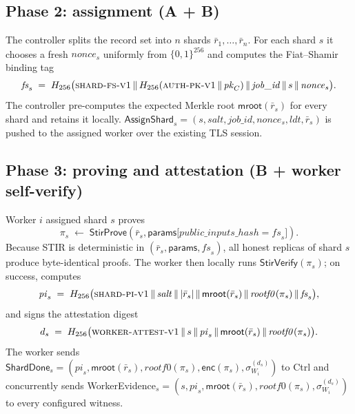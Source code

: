 \documentclass[11pt,a4paper]{article}
\theoremstyle{definition}
\theoremstyle{plain}
\newcommand{\msg}[1]{\textsf{#1}}
\newcommand{\ctrl}{\msg{Ctrl}}
\newcommand{\hash}{\ensuremath{H}}
\newcommand{\sig}[2]{\ensuremath{\sigma_{#1}^{(#2)}}}
\newcommand{\concat}{\,\Vert\,}
\begin{document}
\subsection{Phase 2: assignment (A + B)}

The controller splits the record set into $n$ shards
$\bar{r}_1, \dots, \bar{r}_n$.  For each shard $s$ it chooses a fresh
$\mathit{nonce}_s$ uniformly from $\{0,1\}^{256}$ and computes the
Fiat--Shamir binding tag
\begin{equation}
  \mathit{fs}_s \;=\; \hash_{256}\bigl(\textsc{shard-fs-v1}
        \concat \hash_{256}(\textsc{auth-pk-v1} \concat \mathit{pk}_C)
        \concat \mathit{job\_id}
        \concat s
        \concat \mathit{nonce}_s\bigr).
  \label{eq:fs-binding}
\end{equation}
The controller pre-computes the expected Merkle root
$\mathsf{mroot}(\bar{r}_s)$ for every shard and retains it locally.
$\msg{AssignShard}_s = (s, \mathit{salt}, \mathit{job\_id},
\mathit{nonce}_s, \mathit{ldt}, \bar{r}_s)$ is pushed to the assigned
worker over the existing TLS session.

\subsection{Phase 3: proving and attestation (B + worker self-verify)}

Worker $i$ assigned shard $s$ proves
\[
  \pi_s \;\leftarrow\; \msg{StirProve}(\bar{r}_s,
      \textsf{params}\bigl[\mathit{public\_inputs\_hash} = \mathit{fs}_s\bigr]).
\]
Because STIR is deterministic in
$(\bar{r}_s, \textsf{params}, \mathit{fs}_s)$, all honest replicas of
shard $s$ produce byte-identical proofs.  The worker then locally runs
$\msg{StirVerify}(\pi_s)$; on success, computes
\begin{equation}
  \mathit{pi}_s \;=\; \hash_{256}\bigl(\textsc{shard-pi-v1}
       \concat \mathit{salt} \concat |\bar{r}_s|
       \concat \mathsf{mroot}(\bar{r}_s)
       \concat \mathit{rootf0}(\pi_s)
       \concat \mathit{fs}_s\bigr),
  \label{eq:pi-hash}
\end{equation}
and signs the attestation digest
\begin{equation}
  d_s \;=\; \hash_{256}\bigl(\textsc{worker-attest-v1}
       \concat s
       \concat \mathit{pi}_s
       \concat \mathsf{mroot}(\bar{r}_s)
       \concat \mathit{rootf0}(\pi_s)\bigr).
  \label{eq:attest-digest}
\end{equation}
The worker sends $\msg{ShardDone}_s = (\mathit{pi}_s,
\mathsf{mroot}(\bar{r}_s), \mathit{rootf0}(\pi_s),
\mathsf{enc}(\pi_s), \sig{W_i}{d_s})$ to \ctrl{} and concurrently sends
\msg{WorkerEvidence}$_s = (s, \mathit{pi}_s, \mathsf{mroot}(\bar{r}_s),
\mathit{rootf0}(\pi_s), \sig{W_i}{d_s})$ to every configured witness.
\end{document}
